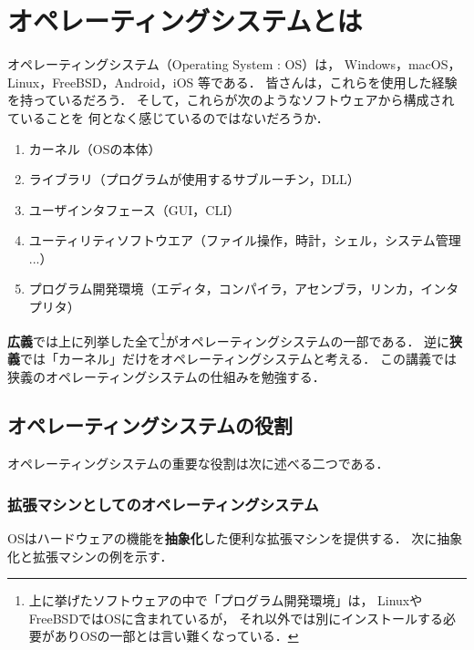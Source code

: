 \chapter{オペレーティングシステムとは}

オペレーティングシステム（Operating System : OS）は，
Windows，macOS，Linux，FreeBSD，Android，iOS
等である．
皆さんは，これらを使用した経験を持っているだろう．
そして，これらが次のようなソフトウェアから構成されていることを
何となく感じているのではないだろうか．

\begin{enumerate}
\item カーネル（OSの本体）
\item ライブラリ（プログラムが使用するサブルーチン，DLL）
\item ユーザインタフェース（GUI，CLI）
\item ユーティリティソフトウエア（ファイル操作，時計，シェル，システム管理 ...）
\item プログラム開発環境（エディタ，コンパイラ，アセンブラ，リンカ，インタプリタ）
\end{enumerate}

{\bf 広義}では上に列挙した全て\footnote{
上に挙げたソフトウェアの中で「プログラム開発環境」は，
LinuxやFreeBSDではOSに含まれているが，
それ以外では別にインストールする必要がありOSの一部とは言い難くなっている．
}がオペレーティングシステムの一部である．
逆に{\bf 狭義}では「カーネル」だけをオペレーティングシステムと考える．
この講義では狭義のオペレーティングシステムの仕組みを勉強する．

\section{オペレーティングシステムの役割}

オペレーティングシステムの重要な役割は次に述べる二つである．

\subsection{拡張マシンとしてのオペレーティングシステム}

OSはハードウェアの機能を{\bf 抽象化}した便利な拡張マシンを提供する．
次に抽象化と拡張マシンの例を示す．

